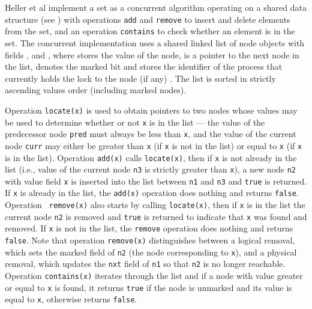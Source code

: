 \documentclass{article}
\theoremstyle{plain}
\newcounter{thm}
\theoremstyle{definition}
\begin{document}
Heller et al \cite{HHLMSS07} implement a set as a concurrent algorithm
operating on a shared data structure (see ) with
operations {\tt add} and {\tt remove} to insert and delete elements
from the set, and an operation {\tt contains} to check whether an
element is in the set. The concurrent implementation uses a shared
linked list of node objects with fields , and ,
where  stores the value of the node,  is a pointer to the
next node in the list,  denotes the marked bit and  stores
the identifier of the process that currently holds the lock to the
node (if any) \cite{HHLMSS07}.  The list is sorted in strictly
ascending values order (including marked nodes).

Operation {\tt locate(x)} is used to obtain pointers to two nodes
whose values may be used to determine whether or not {\tt x} is in the
list --- the value of the predecessor node {\tt pred} must always be
less than {\tt x}, and the value of the current node {\tt curr} may
either be greater than {\tt x} (if {\tt x} is not in the list) or
equal to {\tt x} (if {\tt x} is in the list). Operation {\tt add(x)}
calls {\tt locate(x)}, then if {\tt x} is not already in the list
(i.e., value of the current node {\tt n3} is strictly greater than
{\tt x}), a new node {\tt n2} with value field {\tt x} is inserted
into the list between {\tt n1} and {\tt n3} and {\tt true} is
returned. If {\tt x} is already in the list, the {\tt add(x)}
operation does nothing and returns {\tt false}. Operation {\tt
  remove(x)} also starts by calling {\tt locate(x)}, then if {\tt x}
is in the list the current node {\tt n2} is removed and {\tt true} is
returned to indicate that {\tt x} was found and removed. If {\tt x} is
not in the list, the {\tt remove} operation does nothing and returns
{\tt false}. Note that operation {\tt remove(x)} distinguishes between
a logical removal, which sets the marked field of {\tt n2} (the node
corresponding to {\tt x}), and a physical removal, which updates the
{\tt nxt} field of {\tt n1} so that {\tt n2} is no longer
reachable. Operation {\tt contains(x)} iterates through the list and
if a node with value greater or equal to {\tt x} is found, it returns
{\tt true} if the node is unmarked and its value is equal to {\tt x},
otherwise returns {\tt false}.
\end{document}
